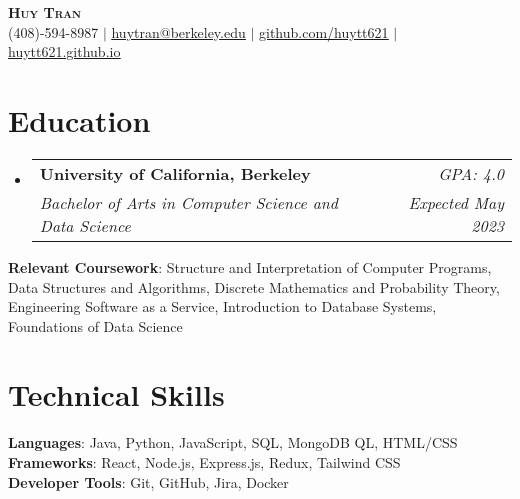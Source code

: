 \documentclass[letterpaper,11pt]{article}
\makeatletter
\newcommand{\resumeSubheading}[4]{
  \vspace{-2pt}\item
    \begin{tabular*}{0.97\textwidth}[t]{l@{\extracolsep{\fill}}r}
      \textbf{#1} & #2 \\
      \textit{\small#3} & \textit{\small #4} \\
    \end{tabular*}\vspace{-7pt}
}
\newcommand{\resumeSubHeadingListStart}{\begin{itemize}[leftmargin=0.15in, label={}]}
\newcommand{\resumeSubHeadingListEnd}{\end{itemize}}
\makeatother
\begin{document}

\begin{center}
    \textbf{\Huge \scshape Huy Tran} \\ \vspace{1pt}
    \small (408)-594-8987 $|$ \href{mailto:x@x.com}{\underline{huytran@berkeley.edu}} $|$ 
    \href{https://github.com/huytt621}{\underline{github.com/huytt621}} $|$
    \href{http://huytt621.github.io/}{\underline{huytt621.github.io}}
\end{center}


\section{Education}
  \resumeSubHeadingListStart
    \resumeSubheading
      {University of California, Berkeley}{\emph{GPA: 4.0}}
      {Bachelor of Arts in Computer Science and Data Science}{Expected May 2023}
  \resumeSubHeadingListEnd
  \begin{itemize}[leftmargin=0.15in, label={}]
     \small{\item{
      \textbf{Relevant Coursework}{: Structure and Interpretation of Computer Programs, Data Structures and Algorithms, Discrete Mathematics and Probability Theory, Engineering Software as a Service, Introduction to Database Systems, Foundations of Data Science}
     }}
  \end{itemize}


%
\section{Technical Skills}
 \begin{itemize}[leftmargin=0.15in, label={}]
    \small{\item{
     \textbf{Languages}{: Java, Python, JavaScript, SQL, MongoDB QL, HTML/CSS} \\
     \textbf{Frameworks}{: React, Node.js, Express.js, Redux, Tailwind CSS} \\
     \textbf{Developer Tools}{: Git, GitHub, Jira, Docker}
    }}
 \end{itemize}
\end{document}
